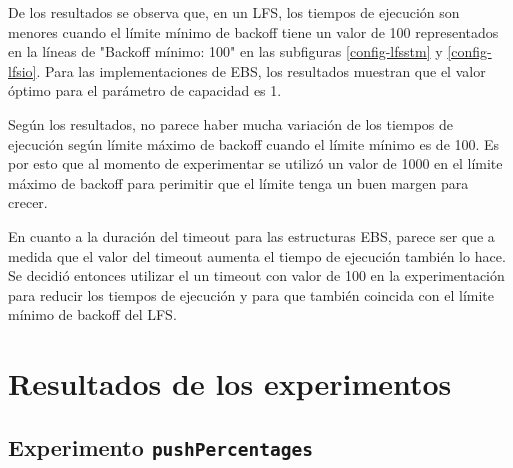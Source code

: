 \begin{appendices}
De los resultados se observa que, en un LFS, los tiempos de ejecución son menores cuando el límite mínimo de backoff tiene un valor de 100 representados en la líneas de "Backoff mínimo: 100" en las subfiguras \ref{config-lfsstm} y \ref{config-lfsio}.
Para las implementaciones de EBS, los resultados muestran que el valor óptimo para el parámetro de capacidad es 1.

Según los resultados, no parece haber mucha variación de los tiempos de ejecución según límite máximo de backoff cuando el límite mínimo es de 100. Es por esto que al momento de experimentar se utilizó un valor de 1000 en el límite máximo de backoff para perimitir que el límite tenga un buen margen para crecer.

En cuanto a la duración del timeout para las estructuras EBS, parece ser que a medida que el valor del timeout aumenta el tiempo de ejecución también lo hace. Se decidió entonces utilizar el un timeout con valor de 100 en la experimentación para reducir los tiempos de ejecución y para que también coincida con el límite mínimo de backoff del LFS.


\chapter{Resultados de los experimentos}\label{ch:otherResults}
\section{Experimento \texttt{pushPercentages}}\label{app-pushPercentages}


\end{appendices}
